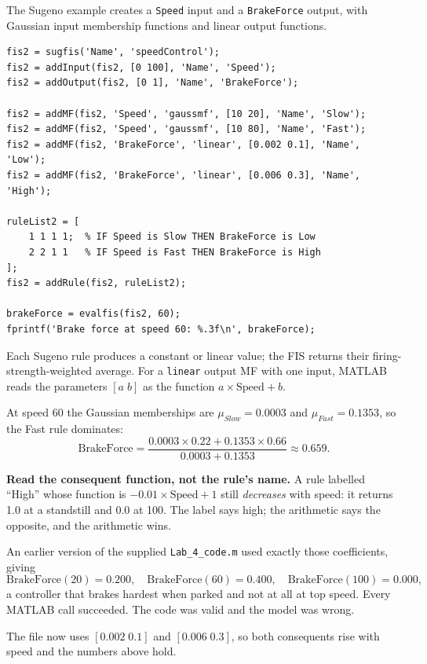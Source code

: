 The Sugeno example creates a \texttt{Speed} input and a \texttt{BrakeForce} output, with Gaussian input membership functions and linear output functions.

\begin{lstlisting}[style=mlmatlab]
fis2 = sugfis('Name', 'speedControl');
fis2 = addInput(fis2, [0 100], 'Name', 'Speed');
fis2 = addOutput(fis2, [0 1], 'Name', 'BrakeForce');

fis2 = addMF(fis2, 'Speed', 'gaussmf', [10 20], 'Name', 'Slow');
fis2 = addMF(fis2, 'Speed', 'gaussmf', [10 80], 'Name', 'Fast');
fis2 = addMF(fis2, 'BrakeForce', 'linear', [0.002 0.1], 'Name', 'Low');
fis2 = addMF(fis2, 'BrakeForce', 'linear', [0.006 0.3], 'Name', 'High');

ruleList2 = [
    1 1 1 1;  % IF Speed is Slow THEN BrakeForce is Low
    2 2 1 1   % IF Speed is Fast THEN BrakeForce is High
];
fis2 = addRule(fis2, ruleList2);

brakeForce = evalfis(fis2, 60);
fprintf('Brake force at speed 60: %.3f\n', brakeForce);
\end{lstlisting}

Each Sugeno rule produces a constant or linear value; the FIS returns their firing-strength-weighted average. For a \texttt{linear} output MF with one input, MATLAB reads the parameters \([a\;b]\) as the function \(a\times\text{Speed}+b\).

At speed 60 the Gaussian memberships are \(\mu_{Slow}=0.0003\) and \(\mu_{Fast}=0.1353\), so the Fast rule dominates:
\[
\text{BrakeForce}=\frac{0.0003\times0.22+0.1353\times0.66}{0.0003+0.1353}\approx0.659.
\]

\begin{pitfall}
\textbf{Read the consequent function, not the rule's name.} A rule labelled ``High'' whose function is \(-0.01\times\text{Speed}+1\) still \emph{decreases} with speed: it returns 1.0 at a standstill and 0.0 at 100. The label says high; the arithmetic says the opposite, and the arithmetic wins.

An earlier version of the supplied \texttt{Lab\_4\_code.m} used exactly those coefficients, giving
\[
\text{BrakeForce}(20)=0.200,\quad
\text{BrakeForce}(60)=0.400,\quad
\text{BrakeForce}(100)=0.000,
\]
a controller that brakes hardest when parked and not at all at top speed. Every MATLAB call succeeded. The code was valid and the model was wrong.

The file now uses \([0.002\;0.1]\) and \([0.006\;0.3]\), so both consequents rise with speed and the numbers above hold.
\end{pitfall}

